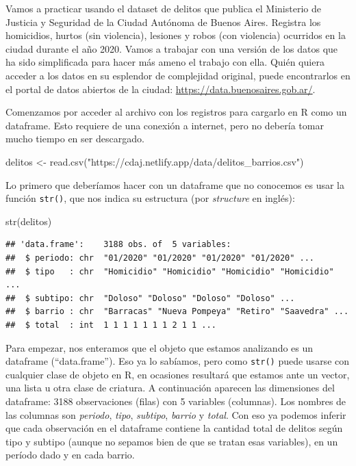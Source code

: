 \documentclass[
]{book}
\newenvironment{Shaded}{\begin{snugshade}}{\end{snugshade}}
\newcommand{\FunctionTok}[1]{\textcolor[rgb]{0.00,0.00,0.00}{#1}}
\newcommand{\NormalTok}[1]{#1}
\newcommand{\OtherTok}[1]{\textcolor[rgb]{0.56,0.35,0.01}{#1}}
\newcommand{\StringTok}[1]{\textcolor[rgb]{0.31,0.60,0.02}{#1}}
\begin{document}
Vamos a practicar usando el dataset de delitos que publica el Ministerio de Justicia y Seguridad de la Ciudad Autónoma de Buenos Aires. Registra los homicidios, hurtos (sin violencia), lesiones y robos (con violencia) ocurridos en la ciudad durante el año 2020. Vamos a trabajar con una versión de los datos que ha sido simplificada para hacer más ameno el trabajo con ella. Quién quiera acceder a los datos en su esplendor de complejidad original, puede encontrarlos en el portal de datos abiertos de la ciudad: \url{https://data.buenosaires.gob.ar/}.

Comenzamos por acceder al archivo con los registros para cargarlo en R como un dataframe. Esto requiere de una conexión a internet, pero no debería tomar mucho tiempo en ser descargado.

\begin{Shaded}
\begin{Highlighting}[]
\NormalTok{delitos }\OtherTok{\textless{}{-}} \FunctionTok{read.csv}\NormalTok{(}\StringTok{"https://cdaj.netlify.app/data/delitos\_barrios.csv"}\NormalTok{)}
\end{Highlighting}
\end{Shaded}

Lo primero que deberíamos hacer con un dataframe que no conocemos es usar la función \texttt{str()}, que nos indica su estructura (por \emph{structure} en inglés):

\begin{Shaded}
\begin{Highlighting}[]
\FunctionTok{str}\NormalTok{(delitos)}
\end{Highlighting}
\end{Shaded}

\begin{verbatim}
## 'data.frame':    3188 obs. of  5 variables:
##  $ periodo: chr  "01/2020" "01/2020" "01/2020" "01/2020" ...
##  $ tipo   : chr  "Homicidio" "Homicidio" "Homicidio" "Homicidio" ...
##  $ subtipo: chr  "Doloso" "Doloso" "Doloso" "Doloso" ...
##  $ barrio : chr  "Barracas" "Nueva Pompeya" "Retiro" "Saavedra" ...
##  $ total  : int  1 1 1 1 1 1 1 2 1 1 ...
\end{verbatim}

Para empezar, nos enteramos que el objeto que estamos analizando es un dataframe (``data.frame''). Eso ya lo sabíamos, pero como \texttt{str()} puede usarse con cualquier clase de objeto en R, en ocasiones resultará que estamos ante un vector, una lista u otra clase de criatura. A continuación aparecen las dimensiones del dataframe: 3188 observaciones (filas) con 5 variables (columnas). Los nombres de las columnas son \emph{periodo}, \emph{tipo}, \emph{subtipo}, \emph{barrio} y \emph{total}. Con eso ya podemos inferir que cada observación en el dataframe contiene la cantidad total de delitos según tipo y subtipo (aunque no sepamos bien de que se tratan esas variables), en un período dado y en cada barrio.
\end{document}
